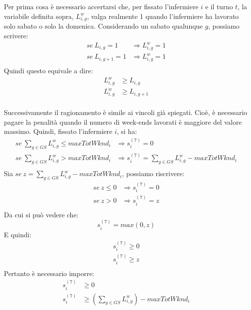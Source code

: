 Per prima cosa è necessario accertarsi che, per fissato l'infermiere $i$ e il turno $t$, la variabile definita sopra, $L_{i, g}^w$, valga realmente 1 quando l'infermiere ha lavorato solo sabato o solo la domenica. Considerando un sabato qualunque $g$, possiamo scrivere:
\begin{equation}
\begin{split}
se ~ L_{i, g} = 1 &\Longrightarrow L_{i, g}^w = 1\\
se ~ L_{i, g+1} = 1 &\Longrightarrow L_{i, g}^w = 1\\
\end{split}
\end{equation}
Quindi questo equivale a dire:
\begin{equation}
\begin{split}
L_{i, g}^w &\geq L_{i, g}\\
L_{i, g}^w &\geq L_{i, g+1}\\
\end{split}
\end{equation}

Successivamente il ragionamento è simile ai vincoli già spiegati.
Cioè, è necessario pagare la penalità quando il numero di week-ends lavorati è maggiore del valore massimo. Quindi, fissato l'infermiere $i$, si ha:
\begin{equation}
\begin{split}
se ~ \sum_{g \in GS} L_{i, g}^w \leq maxTotWknd_i &\Longrightarrow s^{(7)}_{i} = 0\\
se ~ \sum_{g \in GS} L_{i, g}^w > maxTotWknd_i &\Longrightarrow s^{(7)}_{i} = \sum_{g \in GS} L_{i, g}^w - maxTotWknd_i\\
\end{split}
\end{equation}
Sia $se ~ z = \sum_{g \in GS} L_{i, g}^w - maxTotWknd_i$, possiamo riscrivere:
\begin{equation}
\begin{split}
se ~ z \leq 0 &\Longrightarrow s^{(7)}_{i} = 0\\
se ~ z > 0 &\Longrightarrow s^{(7)}_{i} = z\\
\end{split}
\end{equation}
Da cui si può vedere che:
\begin{equation}
\label{eq:maxS7}
s^{(7)}_{i} = max(0, z)
\end{equation}
E quindi:
\begin{equation}
\begin{split}
s^{(7)}_{i} \geq 0\\
s^{(7)}_{i} \geq z\\
\end{split}
\end{equation}
Pertanto è necessario imporre:
\begin{equation}
\begin{split}
s^{(7)}_{i} &\geq 0\\
s^{(7)}_{i} &\geq (\sum_{g \in GS} L_{i, g}^w ) - maxTotWknd_i
\end{split}
\end{equation}

